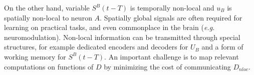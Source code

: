 \documentclass[journal,onecolumn,11pt]{IEEEtran}
\begin{document}
On the other hand, variable $S^B(t-T)$ is temporally non-local and $u_{B}$ is spatially non-local to neuron $A$.
Spatially global signals are often required for learning on practical tasks, and even commonplace in the brain (\emph{e.g.} neuromodulation).
Non-local information can be transmitted through special structures, for example dedicated encoders and decoders for $U_B$ and a form of working memory for $S^B(t-T)$.
An important challenge is to map relevant computations on functions of $D$ by minimizing the cost of communicating $D_{nloc}$.



%
\end{document}
